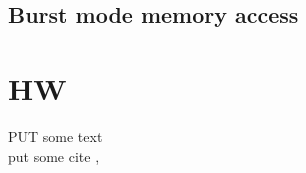 \subsection*{Burst mode memory access}
\label{sec:burstmode}
\paragraph*{}


\section{HW}
\label{sec:hw}
PUT some text\\
put some cite \cite[p.11~eq.2.6]{chu2006a}, \cite[p.11~eq.2.6]{Sparsoe2014}
